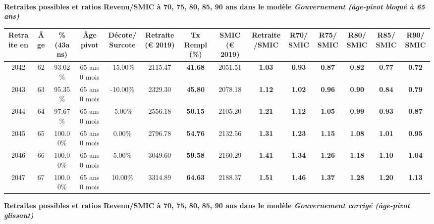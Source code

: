  ~\\{\bf \noindent Retraites possibles et ratios Revenu/SMIC à 70, 75, 80, 85, 90 ans dans le modèle \emph{Gouvernement (âge-pivot bloqué à 65 ans)}}  
 
\begin{adjustbox}{max width=\textwidth} 
\begin{tabular}[htb]{|c|c||c|c|c||c|c||c|c||c|c|c|c|c|} 
\hline 
 Retraite en &  Âge &  \%(43ans) &  Âge pivot &  Décote/Surcote &  Retraite (\euro{} 2019) &  Tx Rempl(\%) &  SMIC (\euro{} 2019) &  Retraite/SMIC &  R70/SMIC &  R75/SMIC &  R80/SMIC &  R85/SMIC &  R90/SMIC \\ 
\hline \hline 
 2042 &  62 &  93.02\% &  65 ans 0 mois &  -15.00\% &  2115.47 &  {\bf 41.68} &  2051.51 &  {\bf 1.03} &  {\bf {\color{red} 0.93}} &  {\bf {\color{red} 0.87}} &  {\bf {\color{red} 0.82}} &  {\bf {\color{red} 0.77}} &  {\bf {\color{red} 0.72}} \\ 
\hline 
 2043 &  63 &  95.35\% &  65 ans 0 mois &  -10.00\% &  2329.30 &  {\bf 45.80} &  2078.18 &  {\bf 1.12} &  {\bf 1.02} &  {\bf {\color{red} 0.96}} &  {\bf {\color{red} 0.90}} &  {\bf {\color{red} 0.84}} &  {\bf {\color{red} 0.79}} \\ 
\hline 
 2044 &  64 &  97.67\% &  65 ans 0 mois &  -5.00\% &  2556.18 &  {\bf 50.15} &  2105.20 &  {\bf 1.21} &  {\bf 1.12} &  {\bf 1.05} &  {\bf {\color{red} 0.99}} &  {\bf {\color{red} 0.93}} &  {\bf {\color{red} 0.87}} \\ 
\hline 
 2045 &  65 &  100.00\% &  65 ans 0 mois &  0.00\% &  2796.78 &  {\bf 54.76} &  2132.56 &  {\bf 1.31} &  {\bf 1.23} &  {\bf 1.15} &  {\bf 1.08} &  {\bf 1.01} &  {\bf {\color{red} 0.95}} \\ 
\hline 
 2046 &  66 &  100.00\% &  65 ans 0 mois &  5.00\% &  3049.60 &  {\bf 59.58} &  2160.29 &  {\bf 1.41} &  {\bf 1.34} &  {\bf 1.26} &  {\bf 1.18} &  {\bf 1.10} &  {\bf 1.04} \\ 
\hline 
 2047 &  67 &  100.00\% &  65 ans 0 mois &  10.00\% &  3314.89 &  {\bf 64.63} &  2188.37 &  {\bf 1.51} &  {\bf 1.46} &  {\bf 1.37} &  {\bf 1.28} &  {\bf 1.20} &  {\bf 1.13} \\ 
\hline 
\hline 
\end{tabular} 
\end{adjustbox} 
 
 \vspace{0.1cm} 
{\bf \noindent Retraites possibles et ratios Revenu/SMIC à 70, 75, 80, 85, 90 ans dans le modèle \emph{Gouvernement corrigé (âge-pivot glissant)}}  
 
